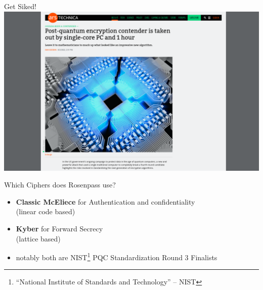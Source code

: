 \documentclass{rosenpass-beamer}
\let\say\enquote
\begin{document}

\begin{frame}{Get Siked!\cite{arstechnica-article}\cite{cryptoeprint:2022/975}}
  \includegraphics[height=.9\textheight]{assets/ars-headline.png}
\end{frame}


\begin{frame}{Which Ciphers does Rosenpass use?}
  \begin{itemize}
    \item \textbf{Classic McEliece} for Authentication and confidentiality\\
	    (linear code based)
    \item \textbf{Kyber} for Forward Secrecy\\
      (lattice based)
    \item notably both are NIST\footnote{\say{National Institute of Standards and Technology} -- NIST} PQC Standardization Round 3 Finalists\cite{pqc-standardization}
  \end{itemize}
\end{frame}

\end{document}
